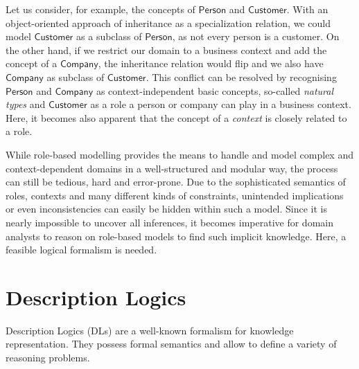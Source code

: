 Let us consider, for example, the concepts of $\mathsf{Person}$ and $\mathsf{Customer}$. With an
object-oriented approach of inheritance as a specialization relation, we could model
$\mathsf{Customer}$ as a subclass of $\mathsf{Person}$, as not every person is a customer.
On the other hand, if we restrict our domain to a business context and add the concept of a
$\mathsf{Company}$, the inheritance relation would flip and we also have $\mathsf{Company}$ as
subclass of $\mathsf{Customer}$.  This conflict can be resolved by recognising
$\mathsf{Person}$ and $\mathsf{Company}$ as context-independent basic concepts, so-called
\emph{natural types} and $\mathsf{Customer}$ as a role a person or company can play in a
business context. Here, it becomes also apparent that the concept of a \emph{context} is closely
related to a role.

While role-based modelling provides the means to handle and model complex and context-dependent
domains in a well-structured and modular way, the process can still be tedious, hard and
error-prone. Due to the sophisticated semantics of roles, contexts and many different kinds of
constraints, unintended implications or even inconsistencies can easily be hidden within such a
model. Since it is nearly impossible to uncover all inferences, it becomes imperative for domain
analysts to reason on role-based models to find such implicit knowledge.  Here, a feasible logical
formalism is needed.

\section{Description Logics}
\label{sec:intro-description-logics}

Description Logics (DLs) \cite{DLhandbook-07} are a well-known formalism for knowledge
representation. They possess formal semantics and allow to define a variety of reasoning problems.

